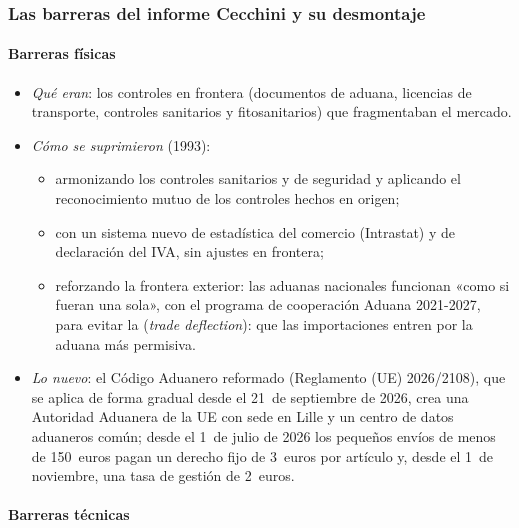 \documentclass[11pt]{article}
\begin{document}
\subsubsection{Las barreras del informe Cecchini y su desmontaje}\label{sec:barreras}

\paragraph{Barreras físicas}

\begin{itemize}
\item \emph{Qué eran}: los controles en frontera (documentos de aduana, licencias de transporte, controles sanitarios y fitosanitarios) que fragmentaban el mercado.
\item \emph{Cómo se suprimieron} (1993):
  \begin{itemize}
  \item armonizando los controles sanitarios y de seguridad y aplicando el reconocimiento mutuo de los controles hechos en origen;
  \item con un sistema nuevo de estadística del comercio (Intrastat) y de declaración del IVA, sin ajustes en frontera;
  \item reforzando la frontera exterior: las aduanas nacionales funcionan «como si fueran una sola», con el programa de cooperación Aduana 2021-2027\nocite{UE2021Aduana}, para evitar la  (\emph{trade deflection}): que las importaciones entren por la aduana más permisiva.
  \end{itemize}
\item \emph{Lo nuevo}: el Código Aduanero reformado (Reglamento (UE) 2026/2108), que se aplica de forma gradual desde el 21~de septiembre de 2026, crea una Autoridad Aduanera de la UE con sede en Lille y un centro de datos aduaneros común; desde el 1~de julio de 2026 los pequeños envíos de menos de 150~euros pagan un derecho fijo de 3~euros por artículo y, desde el 1~de noviembre, una tasa de gestión de 2~euros\nocite{CE2026ReformaAduanera}.
\end{itemize}

\paragraph{Barreras técnicas}
\end{document}
